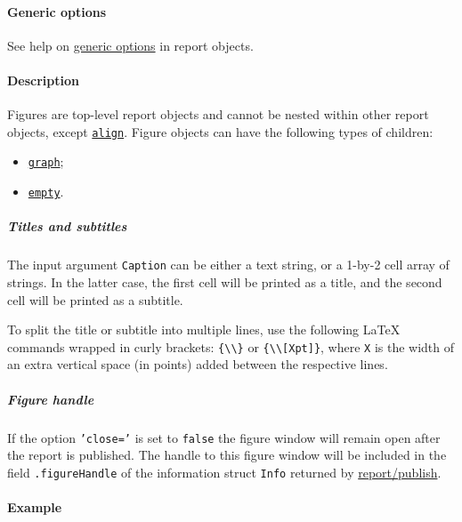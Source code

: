  \paragraph{Generic options}
 
 See help on \href{report/Contents}{generic options} in report objects.
 
 \paragraph{Description}
 
 Figures are top-level report objects and cannot be nested within other
 report objects, except \href{report/align}{\texttt{align}}. Figure
 objects can have the following types of children:
 
 \begin{itemize}
 \item
   \href{report/graph}{\texttt{graph}};
 \item
   \href{report/empty}{\texttt{empty}}.
 \end{itemize}
 
 \subparagraph{Titles and subtitles}
 
 The input argument \texttt{Caption} can be either a text string, or a
 1-by-2 cell array of strings. In the latter case, the first cell will be
 printed as a title, and the second cell will be printed as a subtitle.
 
 To split the title or subtitle into multiple lines, use the following
 LaTeX commands wrapped in curly brackets:
 \texttt{\{\textbackslash{}\textbackslash{}\}} or
 \texttt{\{\textbackslash{}\textbackslash{}{[}Xpt{]}\}}, where \texttt{X}
 is the width of an extra vertical space (in points) added between the
 respective lines.
 
 \subparagraph{Figure handle}
 
 If the option \texttt{'close='} is set to \texttt{false} the figure
 window will remain open after the report is published. The handle to
 this figure window will be included in the field \texttt{.figureHandle}
 of the information struct \texttt{Info} returned by
 \url{report/publish}.
 
 \paragraph{Example}


